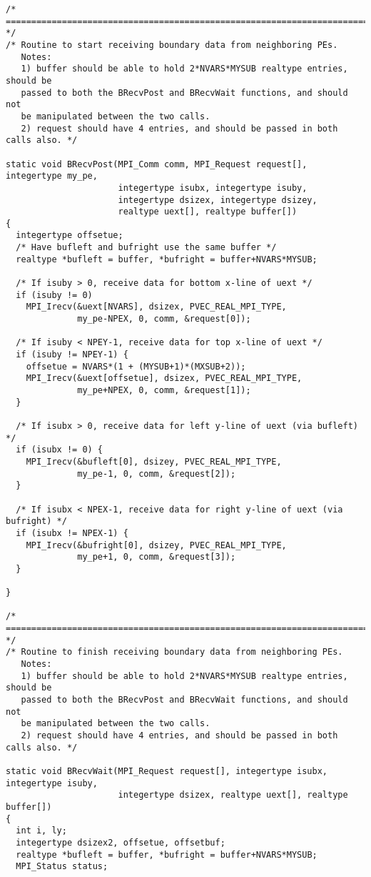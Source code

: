\begin{verbatim}
/* ======================================================================= */
/* Routine to start receiving boundary data from neighboring PEs.
   Notes:
   1) buffer should be able to hold 2*NVARS*MYSUB realtype entries, should be
   passed to both the BRecvPost and BRecvWait functions, and should not
   be manipulated between the two calls.
   2) request should have 4 entries, and should be passed in both calls also. */

static void BRecvPost(MPI_Comm comm, MPI_Request request[], integertype my_pe,
                      integertype isubx, integertype isuby,
                      integertype dsizex, integertype dsizey,
                      realtype uext[], realtype buffer[])
{
  integertype offsetue;
  /* Have bufleft and bufright use the same buffer */
  realtype *bufleft = buffer, *bufright = buffer+NVARS*MYSUB;

  /* If isuby > 0, receive data for bottom x-line of uext */
  if (isuby != 0)
    MPI_Irecv(&uext[NVARS], dsizex, PVEC_REAL_MPI_TYPE,
              my_pe-NPEX, 0, comm, &request[0]);

  /* If isuby < NPEY-1, receive data for top x-line of uext */
  if (isuby != NPEY-1) {
    offsetue = NVARS*(1 + (MYSUB+1)*(MXSUB+2));
    MPI_Irecv(&uext[offsetue], dsizex, PVEC_REAL_MPI_TYPE,
              my_pe+NPEX, 0, comm, &request[1]);
  }
  
  /* If isubx > 0, receive data for left y-line of uext (via bufleft) */
  if (isubx != 0) {
    MPI_Irecv(&bufleft[0], dsizey, PVEC_REAL_MPI_TYPE,
              my_pe-1, 0, comm, &request[2]);
  }
  
  /* If isubx < NPEX-1, receive data for right y-line of uext (via bufright) */
  if (isubx != NPEX-1) {
    MPI_Irecv(&bufright[0], dsizey, PVEC_REAL_MPI_TYPE,
              my_pe+1, 0, comm, &request[3]);
  }
  
}

/* ======================================================================= */
/* Routine to finish receiving boundary data from neighboring PEs.
   Notes:
   1) buffer should be able to hold 2*NVARS*MYSUB realtype entries, should be
   passed to both the BRecvPost and BRecvWait functions, and should not
   be manipulated between the two calls.
   2) request should have 4 entries, and should be passed in both calls also. */

static void BRecvWait(MPI_Request request[], integertype isubx, integertype isuby,
                      integertype dsizex, realtype uext[], realtype buffer[])
{
  int i, ly;
  integertype dsizex2, offsetue, offsetbuf;
  realtype *bufleft = buffer, *bufright = buffer+NVARS*MYSUB;
  MPI_Status status;
  

\end{verbatim}
